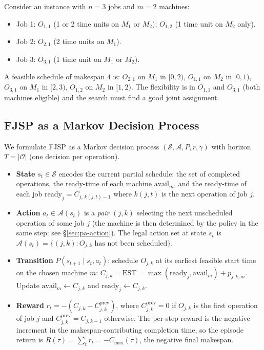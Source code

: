 \documentclass[10pt]{article}
\theoremstyle{definition}
\begin{document}
Consider an instance with $n = 3$ jobs and $m = 2$ machines:
\begin{itemize}
  \item Job 1: $O_{1,1}$ (1 or 2 time units on $M_1$ or
        $M_2$); $O_{1,2}$ (1 time unit on $M_2$ only).
  \item Job 2: $O_{2,1}$ (2 time units on $M_1$).
  \item Job 3: $O_{3,1}$ (1 time unit on $M_1$ or $M_2$).
\end{itemize}
A feasible schedule of makespan $4$ is: $O_{2,1}$ on $M_1$
in $[0,2)$, $O_{1,1}$ on $M_2$ in $[0,1)$, $O_{3,1}$ on
$M_1$ in $[2,3)$, $O_{1,2}$ on $M_2$ in $[1,2)$. The
flexibility is in $O_{1,1}$ and $O_{3,1}$ (both machines
eligible) and the search must find a good joint assignment.

\subsection{FJSP as a Markov Decision Process}

We formulate FJSP as a Markov decision process
$(\mathcal{S}, \mathcal{A}, P, r, \gamma)$ with horizon
$T = |\mathcal{O}|$ (one decision per operation).
\begin{itemize}
  \item \textbf{State} $s_t \in \mathcal{S}$ encodes the
        current partial schedule: the set of completed
        operations, the ready-time of each machine
        $\mathrm{avail}_m$, and the ready-time of each job
        $\mathrm{ready}_j = C_{j,\,k(j,t)-1}$ where
        $k(j,t)$ is the next operation of job $j$.
  \item \textbf{Action} $a_t \in \mathcal{A}(s_t)$ is a
        \emph{pair} $(j, k)$ selecting the next unscheduled
        operation of some job $j$ (the machine is then
        determined by the policy in the same step: see
        \S\ref{sec:pa-action}). The legal action set at
        state $s_t$ is $\mathcal{A}(s_t) = \{(j, k) :
        O_{j,k} \text{ has not been scheduled}\}$.
  \item \textbf{Transition} $P(s_{t+1} \mid s_t, a_t)$:
        schedule $O_{j,k}$ at its earliest feasible start
        time on the chosen machine $m$:
        $C_{j,k} = \mathrm{EST} = \max(\mathrm{ready}_j,
        \mathrm{avail}_m) + p_{j,k,m}$. Update
        $\mathrm{avail}_m \gets C_{j,k}$ and
        $\mathrm{ready}_j \gets C_{j,k}$.
  \item \textbf{Reward} $r_t = -(C_{j,k} - C_{j,k}^{\text{prev}})$,
        where $C_{j,k}^{\text{prev}} = 0$ if $O_{j,k}$ is
        the first operation of job $j$ and
        $C_{j,k}^{\text{prev}} = C_{j,k-1}$ otherwise.
        The per-step reward is the negative increment in
        the makespan-contributing completion time, so the
        episode return is
        $R(\tau) = \sum_t r_t = -C_{\max}(\tau)$, the
        negative final makespan.
\end{itemize}
\end{document}

